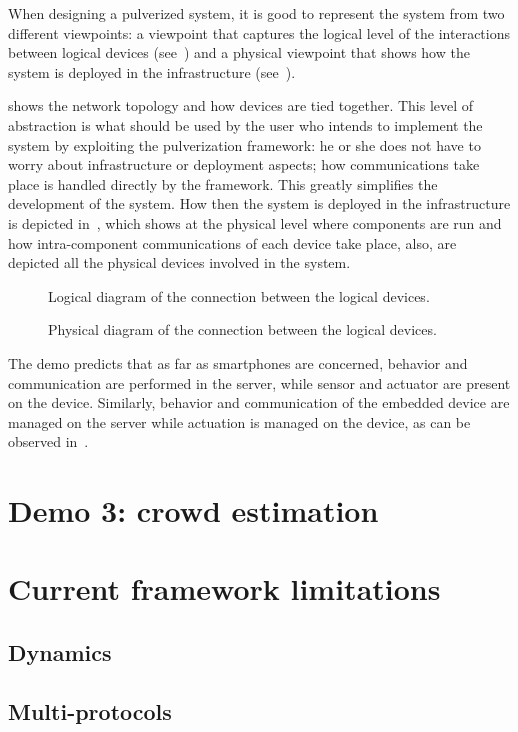 When designing a pulverized system, it is good to represent the system from two different viewpoints: a viewpoint that captures the logical level
of the interactions between logical devices (see~) and a physical viewpoint that shows how the system is deployed in
the infrastructure (see~).

 shows the network topology and how devices are tied together. This level of abstraction is what should be used by
the user who intends to implement the system by exploiting the pulverization framework: he or she does not have to worry about infrastructure or
deployment aspects; how communications take place is handled directly by the framework. This greatly simplifies the development of the system. How
then the system is deployed in the infrastructure is depicted in~, which shows at the physical level where
components are run and how intra-component communications of each device take place, also, are depicted all the physical devices involved in the
system.

\begin{figure}
	\centering
	\caption{Logical diagram of the connection between the logical devices.}
	\label{fig:demo-2-logical-diagram}
\end{figure}

\begin{figure}
	\centering
	\caption{Physical diagram of the connection between the logical devices.}
	\label{fig:demo-2-physical-diagram}
\end{figure}

The demo predicts that as far as smartphones are concerned, behavior and communication are performed in the server, while sensor and actuator are
present on the device.
Similarly, behavior and communication of the embedded device are managed on the server while actuation is managed on the device, as can be observed
in~.


\section{Demo 3: crowd estimation}
\label{sec:demo-3}

\section{Current framework limitations}
\label{sec:framework-limitations}

\subsection{Dynamics}
\label{sec:dynamics}

\subsection{Multi-protocols}
\label{sec:multi-protocols}
